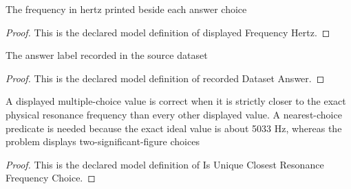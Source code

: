 \begin{definition}
  \label{def:physics:phyx-mini-0889:phyxminiproblems-problemphyxmini0889-answerchoice-displayedfrequencyhertz}
  The frequency in hertz printed beside each answer choice
\end{definition}
\begin{proof}
  This is the declared model definition of displayed Frequency Hertz.
\end{proof}
\begin{definition}
  \label{def:physics:phyx-mini-0889:phyxminiproblems-problemphyxmini0889-recordeddatasetanswer}
  The answer label recorded in the source dataset
\end{definition}
\begin{proof}
  This is the declared model definition of recorded Dataset Answer.
\end{proof}
\begin{definition}
  \label{def:physics:phyx-mini-0889:phyxminiproblems-problemphyxmini0889-isuniqueclosestresonancefrequencychoice}
  A displayed multiple-choice value is correct when it is strictly closer to the exact physical resonance frequency than every other displayed value. A nearest-choice predicate is needed because the exact ideal value is about 5033 Hz, whereas the problem displays two-significant-figure choices
\end{definition}
\begin{proof}
  This is the declared model definition of Is Unique Closest Resonance Frequency Choice.
\end{proof}
